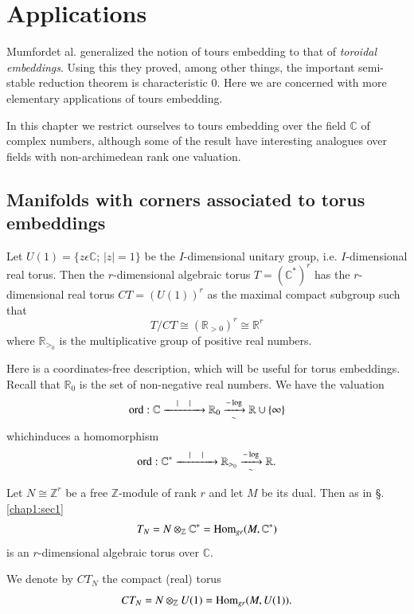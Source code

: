 \chapter{Applications}\label{chap2}

Mumford\pageoriginale et al. \cite[Chap.~2]{keyTE}
generalized the notion of 
tours embedding to that of \textit{toroidal embeddings}. Using this
they proved, among other things, the important semi-stable reduction
theorem is characteristic 0. Here we are concerned with more elementary
applications of tours embedding.  


In this chapter we restrict ourselves to tours embedding over the
field $\mathbb{C}$ of complex numbers, although some of the
result have interesting analogues over fields with non-archimedean rank
one valuation. 

\setcounter{section}{9}
\section{Manifolds with corners associated to torus
  embeddings}\label{chap2:sec10} 

Let $U(1)=\{z \epsilon  \mathbb{C}$; $\mid z \mid =1 \}$ be the
$I$-dimensional unitary group, i.e. $I$-dimensional real torus. Then the
$r$-dimensional algebraic torus $T=(\mathbb{C}^*)^r$ has the
$r$-dimensional real torus $CT = (U(1))^r$ as the maximal compact
subgroup such that  
$$
T/CT\cong (\mathbb{R}_{>0})^r \cong \mathbb{R}^r
$$
where $\mathbb{R}_{>_0}$ is the multiplicative group of positive real
numbers. 

Here is a coordinates-free description, which will be useful for torus
embeddings. Recall that $\mathbb{R}_0$ is the set of non-negative real
numbers. We have the valuation 
$$
 \operatorname{ord} : \mathbb{C} \xrightarrow{\quad | \quad | \quad } \mathbb{R}_0
 \xrightarrow[\sim]{-\log} \mathbb{R}\cup\{\infty\} 
$$
which\pageoriginale induces a homomorphism 
$$
 \operatorname{ord} : \mathbb{C}^* \xrightarrow{ \quad | \quad | \quad } \mathbb{R}_{>_0}
 \xrightarrow[\sim]{-\log} \mathbb{R}. 
$$

\noindent
Let $N \cong \mathbb{Z}^r$ be a free $\mathbb{Z}$-module of rank $r$
and let $M$ be its dual. Then as in \S. \ref{chap1:sec1} 
$$
T_N= N \otimes_\mathbb{Z}\mathbb{C}^* =\operatorname{Hom}_{gr}(M,\mathbb{C}^*) 
$$
is an $r$-dimensional algebraic torus over $\mathbb{C}$.

\begin{defi*}
We denote by $CT_N$ the compact (real) torus 
$$
CT_N=N\otimes_\mathbb{Z}U(1)=\operatorname{Hom}_{gr}(M,U(1)).
$$
\end{defi*}


